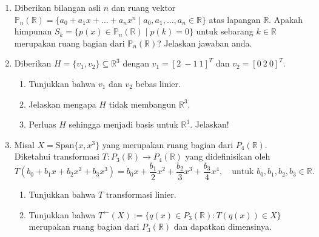 \documentclass[11pt,letterpaper]{article}
\begin{document}
\begin{enumerate}
  \item Diberikan bilangan asli $n$ dan ruang vektor $\mathbb{P}_n(\mathbb{R}) = \{ a_0 + a_1x + \dots + a_nx^n \mid a_0, a_1, \dots, a_n \in \mathbb{R} \}$ atas lapangan $\mathbb{R}$. Apakah himpunan $S_k = \{ p(x) \in \mathbb{P}_n(\mathbb{R}) \mid p(k) = 0 \}$ untuk sebarang $k \in \mathbb{R}$ merupakan ruang bagian dari $\mathbb{P}_n(\mathbb{R})$? Jelaskan jawaban anda.

  \item Diberikan $H = \{ v_1, v_2 \} \subseteq \mathbb{R}^3$ dengan $v_1 = [2 \ -1 \ 1]^T$ dan $v_2 = [0 \ 2 \ 0]^T$.
        \begin{enumerate}
          \item Tunjukkan bahwa $v_1$ dan $v_2$ bebas linier.
          \item Jelaskan mengapa $H$ tidak membangun $\mathbb{R}^3$.
          \item Perluas $H$ sehingga menjadi basis untuk $\mathbb{R}^3$. Jelaskan!
        \end{enumerate}

  \item Misal $X = \text{Span}\{x, x^3\}$ yang merupakan ruang bagian dari $P_4(\mathbb{R})$. Diketahui transformasi $T : P_3(\mathbb{R}) \to P_4(\mathbb{R})$ yang didefinisikan oleh
        \[
          T(b_0 + b_1x + b_2x^2 + b_3x^3) = b_0x + \frac{b_1}{2}x^2 + \frac{b_2}{3}x^3 + \frac{b_3}{4}x^4,
          \quad \text{untuk } b_0, b_1, b_2, b_3 \in \mathbb{R}.
        \]
        \begin{enumerate}
          \item Tunjukkan bahwa $T$ transformasi linier.
          \item Tunjukkan bahwa $T^{\gets}(X) := \{ q(x) \in P_3(\mathbb{R}) : T(q(x)) \in X \}$ merupakan ruang bagian dari $P_3(\mathbb{R})$ dan dapatkan dimensinya.
        \end{enumerate}


\end{enumerate}
\end{document}
